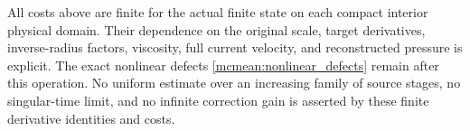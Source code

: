 All costs above are finite for the actual finite state on each compact
interior physical domain. Their dependence on the original scale,
target derivatives, inverse-radius factors, viscosity, full current
velocity, and reconstructed pressure is explicit. The exact nonlinear
defects \eqref{mcmean:nonlinear_defects} remain after this operation.
No uniform estimate over an increasing family of source stages,
no singular-time limit, and no infinite correction gain is asserted
by these finite derivative identities and costs.
